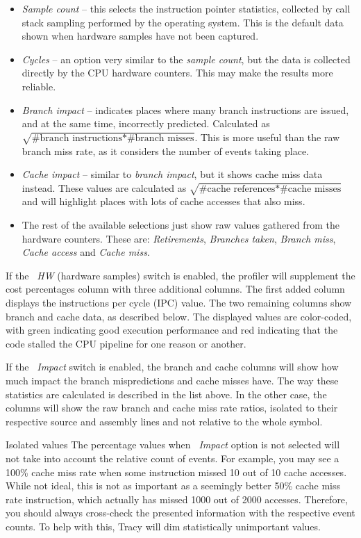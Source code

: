 \documentclass[hidelinks,titlepage,a4paper]{article}
\begin{document}
\begin{itemize}
\item \emph{Sample count} -- this selects the instruction pointer statistics, collected by call stack sampling performed by the operating system. This is the default data shown when hardware samples have not been captured.
\item \emph{Cycles} -- an option very similar to the \emph{sample count}, but the data is collected directly by the CPU hardware counters. This may make the results more reliable.
\item \emph{Branch impact} -- indicates places where many branch instructions are issued, and at the same time, incorrectly predicted. Calculated as $\sqrt{\text{\#branch instructions}*\text{\#branch misses}}$. This is more useful than the raw branch miss rate, as it considers the number of events taking place.
\item \emph{Cache impact} -- similar to \emph{branch impact}, but it shows cache miss data instead. These values are calculated as $\sqrt{\text{\#cache references}*\text{\#cache misses}}$ and will highlight places with lots of cache accesses that also miss.
\item The rest of the available selections just show raw values gathered from the hardware counters. These are: \emph{Retirements}, \emph{Branches taken}, \emph{Branch miss}, \emph{Cache access} and \emph{Cache miss}.
\end{itemize}

If the \emph{\faHammer{}~HW} (hardware samples) switch is enabled, the profiler will supplement the cost percentages column with three additional columns. The first added column displays the instructions per cycle (IPC) value. The two remaining columns show branch and cache data, as described below. The displayed values are color-coded, with green indicating good execution performance and red indicating that the code stalled the CPU pipeline for one reason or another.

If the \emph{\faCarCrash{}~Impact} switch is enabled, the branch and cache columns will show how much impact the branch mispredictions and cache misses have. The way these statistics are calculated is described in the list above. In the other case, the columns will show the raw branch and cache miss rate ratios, isolated to their respective source and assembly lines and not relative to the whole symbol.

\begin{bclogo}[
noborder=true,
couleur=black!5,
logo=\bcattention
]{Isolated values}
The percentage values when \emph{\faCarCrash{}~Impact} option is not selected will not take into account the relative count of events. For example, you may see a 100\% cache miss rate when some instruction missed 10 out of 10 cache accesses. While not ideal, this is not as important as a seemingly better 50\% cache miss rate instruction, which actually has missed 1000 out of 2000 accesses. Therefore, you should always cross-check the presented information with the respective event counts. To help with this, Tracy will dim statistically unimportant values.
\end{bclogo}
\end{document}

